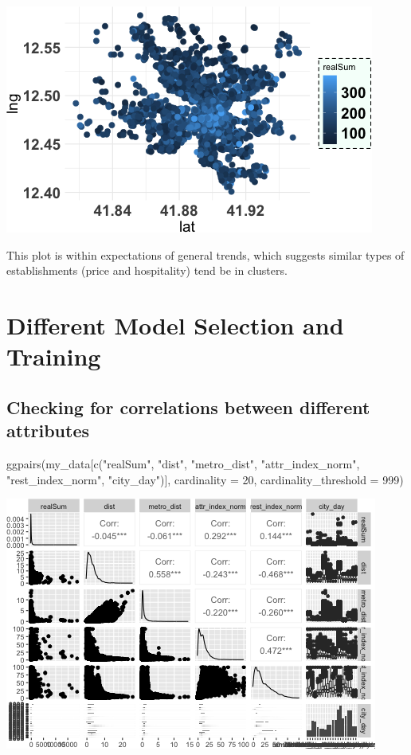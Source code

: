 \documentclass[
]{article}
\newenvironment{Shaded}{\begin{snugshade}}{\end{snugshade}}
\newcommand{\AttributeTok}[1]{\textcolor[rgb]{0.77,0.63,0.00}{#1}}
\newcommand{\DecValTok}[1]{\textcolor[rgb]{0.00,0.00,0.81}{#1}}
\newcommand{\FunctionTok}[1]{\textcolor[rgb]{0.00,0.00,0.00}{#1}}
\newcommand{\NormalTok}[1]{#1}
\newcommand{\StringTok}[1]{\textcolor[rgb]{0.31,0.60,0.02}{#1}}
\begin{document}
\includegraphics{Project_files/figure-latex/unnamed-chunk-30-1.png}

This plot is within expectations of general trends, which suggests
similar types of establishments (price and hospitality) tend be in
clusters.

\hypertarget{different-model-selection-and-training}{%
\section{Different Model Selection and
Training}\label{different-model-selection-and-training}}

\hypertarget{checking-for-correlations-between-different-attributes}{%
\subsection{Checking for correlations between different
attributes}\label{checking-for-correlations-between-different-attributes}}

\begin{Shaded}
\begin{Highlighting}[]
\FunctionTok{ggpairs}\NormalTok{(my\_data[}\FunctionTok{c}\NormalTok{(}\StringTok{"realSum"}\NormalTok{, }\StringTok{"dist"}\NormalTok{, }\StringTok{"metro\_dist"}\NormalTok{, }\StringTok{"attr\_index\_norm"}\NormalTok{,}
    \StringTok{"rest\_index\_norm"}\NormalTok{, }\StringTok{"city\_day"}\NormalTok{)], }\AttributeTok{cardinality =} \DecValTok{20}\NormalTok{, }\AttributeTok{cardinality\_threshold =} \DecValTok{999}\NormalTok{)}
\end{Highlighting}
\end{Shaded}

\includegraphics{Project_files/figure-latex/unnamed-chunk-31-1.png}
\end{document}
